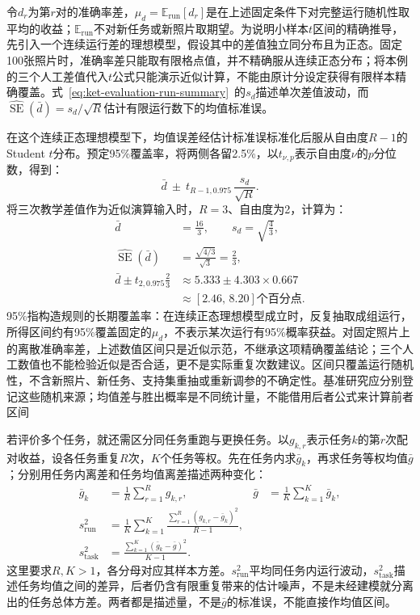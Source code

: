 令$d_r$为第$r$对的准确率差，$\mu_d=\mathbb E_{\mathrm{run}}[d_r]$是在上述固定条件下对完整运行随机性取平均的收益；$\mathbb E_{\mathrm{run}}$不对新任务或新照片取期望。为说明小样本$t$区间的精确推导，先引入一个连续运行差的理想模型，假设其中的差值独立同分布且为正态。固定100张照片时，准确率差只能取有限格点值，并不精确服从连续正态分布；将本例的三个人工差值代入$t$公式只能演示近似计算，不能由原计分设定获得有限样本精确覆盖。式~\eqref{eq:ket-evaluation-run-summary}~的$s_d$描述单次差值波动，而$\widehat{\operatorname{SE}}(\bar d)=s_d/\sqrt R$估计有限运行数下的均值标准误。

在这个连续正态理想模型下，均值误差经估计标准误标准化后服从自由度$R-1$的Student $t$分布。预定95\%覆盖率，将两侧各留2.5\%，以$t_{\nu,p}$表示自由度$\nu$的$p$分位数，得到：
\begin{equation}
  \bar d\ \pm\ t_{R-1,0.975}\,
    \frac{s_d}{\sqrt R}.
  \label{eq:ket-evaluation-paired-interval}
\end{equation}
将三次教学差值作为近似演算输入时，$R=3$、自由度为2，计算为：
\[
  \begin{aligned}
    \bar d&=\frac{16}{3},\qquad s_d=\sqrt{\frac43},\\
    \widehat{\operatorname{SE}}(\bar d)&=\frac{\sqrt{4/3}}{\sqrt3}
      =\frac23,\\
    \bar d\pm t_{2,0.975}\frac23
      &\approx5.333\pm4.303\times0.667\\
      &\approx[2.46,\,8.20]\text{个百分点}.
  \end{aligned}
\]
95\%指构造规则的长期覆盖率：在连续正态理想模型成立时，反复抽取成组运行，所得区间约有95\%覆盖固定的$\mu_d$，不表示某次运行有95\%概率获益。对固定照片上的离散准确率差，上述数值区间只是近似示范，不继承这项精确覆盖结论；三个人工数值也不能检验近似是否合适，更不是实际重复次数建议。区间只覆盖运行随机性，不含新照片、新任务、支持集重抽或重新调参的不确定性。基准研究应分别登记这些随机来源；均值差与胜出概率是不同统计量，不能借用后者公式来计算前者区间

若评价多个任务，就还需区分同任务重跑与更换任务。以$g_{k,r}$表示任务$k$的第$r$次配对收益，设各任务重复$R$次，$K$个任务等权。先在任务内求$\bar g_k$，再求任务等权均值$\bar g$；分别用任务内离差和任务均值离差描述两种变化：
\begin{equation}
  \begin{aligned}
    \bar g_k&=\frac1R\sum_{r=1}^{R}g_{k,r},&
    \bar g&=\frac1K\sum_{k=1}^{K}\bar g_k,\\
    s_{\mathrm{run}}^2
      &=\frac1K\sum_{k=1}^{K}
        \frac{\sum_{r=1}^{R}(g_{k,r}-\bar g_k)^2}{R-1},\\
    s_{\mathrm{task}}^2
      &=\frac{\sum_{k=1}^{K}(\bar g_k-\bar g)^2}{K-1}.
  \end{aligned}
  \label{eq:ket-evaluation-two-variations}
\end{equation}
这里要求$R,K>1$，各分母对应其样本方差。$s_{\mathrm{run}}^2$平均同任务内运行波动，$s_{\mathrm{task}}^2$描述任务均值之间的差异，后者仍含有限重复带来的估计噪声，不是未经建模就分离出的任务总体方差。两者都是描述量，不是$\bar g$的标准误，不能直接作均值区间。

